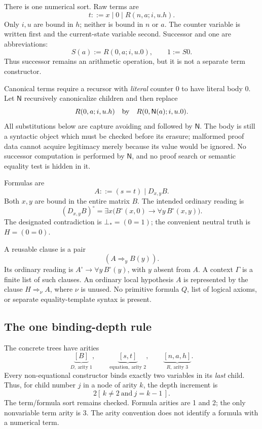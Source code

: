 \documentclass[10pt,letterpaper]{article}
\theoremstyle{definition}
\theoremstyle{remark}
\newcommand{\NF}{\mathsf N}
\begin{document}
There is one numerical sort. Raw terms are
\[
 t ::= x \mid 0 \mid R(n,a;i,u.h).
\]
Only $i,u$ are bound in $h$; neither is bound in $n$ or $a$.
The counter variable is written first and the current-state variable second.
Successor and one are abbreviations:
\[
 S(a):=R(0,a;i,u.0),\qquad 1:=S0.
\]
Thus successor remains an arithmetic operation, but it is not a separate
term constructor.

Canonical terms require a recursor with \emph{literal} counter $0$ to
have literal body $0$. Let $\NF$ recursively canonicalize children and
then replace
\[
 R(0,a;i,u.h)\quad\hbox{by}\quad R(0,\NF(a);i,u.0).
\]
All substitutions below are capture avoiding and followed by $\NF$.
The body is still a syntactic object which must be checked before its
erasure; malformed proof data cannot acquire legitimacy merely because
its value would be ignored. No successor computation is performed by
$\NF$, and no proof search or semantic equality test is hidden in it.

Formulas are
\[
 A ::= (s=t)\mid D_{x,y}B.
\]
Both $x,y$ are bound in the entire matrix $B$. The intended ordinary
reading is
\[
 (D_{x,y}B)^\circ
   =\exists x\bigl(B^\circ(x,0)\to\forall y\,B^\circ(x,y)\bigr).
 \tag{D}
\]
The designated contradiction is $\bot_*=(0=1)$; the convenient neutral
truth is $H=(0=0)$.

A reusable clause is a pair
\[
 (A\Rightarrow_y B(y)).
\]
Its ordinary reading is $A^\circ\to\forall y\,B^\circ(y)$, with $y$ absent
from $A$. A context $\Gamma$ is a finite list of such clauses. An ordinary
local hypothesis $A$ is represented by the clause
$H\Rightarrow_\nu A$, where $\nu$ is unused. No primitive formula $Q$,
list of logical axioms, or separate equality-template syntax is present.

\subsection{The one binding-depth rule}

The concrete trees have arities
\[
 \underbrace{[B]}_{D,\ \text{arity }1},\qquad
 \underbrace{[s,t]}_{\text{equation},\ \text{arity }2},\qquad
 \underbrace{[n,a,h]}_{R,\ \text{arity }3}.
\]
Every non-equational constructor binds exactly two variables in its
\emph{last} child. Thus, for child number $j$ in a node of arity $k$,
the depth increment is
\[
 2[\,k\ne2\ \text{and}\ j=k-1\,].
 \tag{Uniform binding}
\]
The term/formula sort remains checked. Formula arities are 1 and 2;
the only nonvariable term arity is 3. The arity convention does not
identify a formula with a numerical term.
\end{document}
